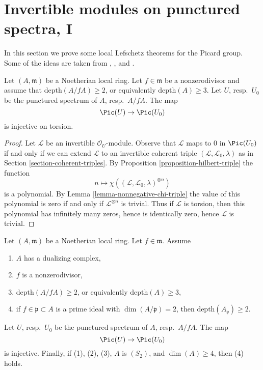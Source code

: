 \section{Invertible modules on punctured spectra, I}
\label{section-local-lefschetz-for-pic}

\noindent
In this section we prove some local Lefschetz theorems for the Picard group.
Some of the ideas are taken from
\cite{Kollar-pic}, \cite{Bhatt-local}, and \cite{Kollar-map-pic}.

\begin{lemma}
\label{lemma-injective-torsion-in-pic}
Let $(A, \mathfrak m)$ be a Noetherian local ring. Let $f \in \mathfrak m$
be a nonzerodivisor and assume that $\text{depth}(A/fA) \geq 2$, or equivalently
$\text{depth}(A) \geq 3$. Let $U$, resp.\ $U_0$ be the punctured
spectrum of $A$, resp.\ $A/fA$. The map
$$
\Pic(U) \to \Pic(U_0)
$$
is injective on torsion.
\end{lemma}

\begin{proof}
Let $\mathcal{L}$ be an invertible $\mathcal{O}_U$-module.
Observe that $\mathcal{L}$ maps to $0$ in $\Pic(U_0)$
if and only if we can extend $\mathcal{L}$ to an invertible
coherent triple $(\mathcal{L}, \mathcal{L}_0, \lambda)$
as in Section \ref{section-coherent-triples}.
By Proposition \ref{proposition-hilbert-triple}
the function
$$
n \longmapsto \chi((\mathcal{L}, \mathcal{L}_0, \lambda)^{\otimes n})
$$
is a polynomial. By Lemma \ref{lemma-nonnegative-chi-triple}
the value of this polynomial is zero if and only if
$\mathcal{L}^{\otimes n}$ is trivial.
Thus if $\mathcal{L}$ is torsion, then this
polynomial has infinitely many zeros, hence is
identically zero, hence $\mathcal{L}$ is trivial.
\end{proof}

\begin{proposition}[Koll\'ar]
\label{proposition-injective-pic}
\begin{reference}
\cite[Theorem 1.9]{Kollar-map-pic}
\end{reference}
Let $(A, \mathfrak m)$ be a Noetherian local ring. Let $f \in \mathfrak m$.
Assume
\begin{enumerate}
\item $A$ has a dualizing complex,
\item $f$ is a nonzerodivisor,
\item $\text{depth}(A/fA) \geq 2$, or equivalently $\text{depth}(A) \geq 3$,
\item if $f \in \mathfrak p \subset A$ is a prime ideal with
$\dim(A/\mathfrak p) = 2$, then $\text{depth}(A_\mathfrak p) \geq 2$.
\end{enumerate}
Let $U$, resp.\ $U_0$ be the punctured spectrum of $A$, resp.\ $A/fA$. The map
$$
\Pic(U) \to \Pic(U_0)
$$
is injective. Finally, if (1), (2), (3), $A$ is $(S_2)$, and
$\dim(A) \geq 4$, then (4) holds.
\end{proposition}

